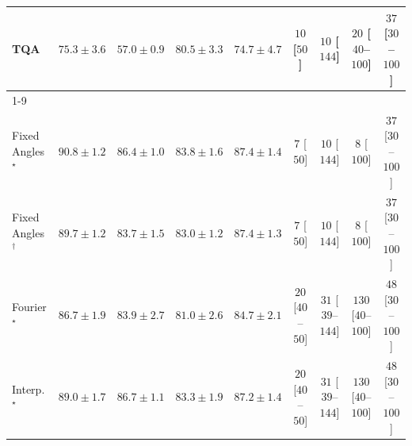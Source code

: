 \begin{tabular}{l|cccc|cccc|}
TQA & {\cellcolor[HTML]{F5841E}} \color[HTML]{F1F1F1} $75.3\pm 3.6$ & {\cellcolor[HTML]{FFFACD}} \color[HTML]{000000} $57.0\pm 0.9$ & {\cellcolor[HTML]{D75908}} \color[HTML]{F1F1F1} $80.5\pm 3.3$ & {\cellcolor[HTML]{F78921}} \color[HTML]{F1F1F1} $74.7\pm 4.7$ & {\cellcolor[HTML]{FFF7F3}} \color[HTML]{000000} $10$ [$50$] & {\cellcolor[HTML]{FFF7F3}} \color[HTML]{000000} $10$ [$144$] & {\cellcolor[HTML]{FFF4F0}} \color[HTML]{000000} $20$ [$40$--$100$] & {\cellcolor[HTML]{FEF1ED}} \color[HTML]{000000} $37$ [$30$--$100$] \\
\cline{1-9}
\multicolumn{9}{c}{\rule{0pt}{8pt}PP} \\
\midrule
Fixed Angles$^\star$ & {\cellcolor[HTML]{004A2B}} \color[HTML]{F1F1F1} $90.8\pm 1.2$ & {\cellcolor[HTML]{036B38}} \color[HTML]{F1F1F1} $86.4\pm 1.0$ & {\cellcolor[HTML]{177B3F}} \color[HTML]{F1F1F1} $83.8\pm 1.6$ & {\cellcolor[HTML]{006435}} \color[HTML]{F1F1F1} $87.4\pm 1.4$ & {\cellcolor[HTML]{FFF7F3}} \color[HTML]{000000} $7$ [$50$] & {\cellcolor[HTML]{FFF7F3}} \color[HTML]{000000} $10$ [$144$] & {\cellcolor[HTML]{FFF7F3}} \color[HTML]{000000} $8$ [$100$] & {\cellcolor[HTML]{FEF1ED}} \color[HTML]{000000} $37$ [$30$--$100$] \\
Fixed Angles$^\dagger$ & {\cellcolor[HTML]{00522E}} \color[HTML]{F1F1F1} $89.7\pm 1.2$ & {\cellcolor[HTML]{177B3F}} \color[HTML]{F1F1F1} $83.7\pm 1.5$ & {\cellcolor[HTML]{1D7F41}} \color[HTML]{F1F1F1} $83.0\pm 1.2$ & {\cellcolor[HTML]{006435}} \color[HTML]{F1F1F1} $87.4\pm 1.3$ & {\cellcolor[HTML]{FFF7F3}} \color[HTML]{000000} $7$ [$50$] & {\cellcolor[HTML]{FFF7F3}} \color[HTML]{000000} $10$ [$144$] & {\cellcolor[HTML]{FFF7F3}} \color[HTML]{000000} $8$ [$100$] & {\cellcolor[HTML]{FEF1ED}} \color[HTML]{000000} $37$ [$30$--$100$] \\
Fourier$^\star$ & {\cellcolor[HTML]{016937}} \color[HTML]{F1F1F1} $86.7\pm 1.9$ & {\cellcolor[HTML]{167A3F}} \color[HTML]{F1F1F1} $83.9\pm 2.7$ & {\cellcolor[HTML]{2B8E4A}} \color[HTML]{F1F1F1} $81.0\pm 2.6$ & {\cellcolor[HTML]{11753D}} \color[HTML]{F1F1F1} $84.7\pm 2.1$ & {\cellcolor[HTML]{FFF4F0}} \color[HTML]{000000} $20$ [$40$--$50$] & {\cellcolor[HTML]{FFF2EE}} \color[HTML]{000000} $31$ [$39$--$144$] & {\cellcolor[HTML]{FDDBD7}} \color[HTML]{000000} $130$ [$40$--$100$] & {\cellcolor[HTML]{FEEEEB}} \color[HTML]{000000} $48$ [$30$--$100$] \\
Interp.$^\star$ & {\cellcolor[HTML]{005830}} \color[HTML]{F1F1F1} $89.0\pm 1.7$ & {\cellcolor[HTML]{016937}} \color[HTML]{F1F1F1} $86.7\pm 1.1$ & {\cellcolor[HTML]{1A7D40}} \color[HTML]{F1F1F1} $83.3\pm 1.9$ & {\cellcolor[HTML]{006636}} \color[HTML]{F1F1F1} $87.2\pm 1.4$ & {\cellcolor[HTML]{FFF4F0}} \color[HTML]{000000} $20$ [$40$--$50$] & {\cellcolor[HTML]{FFF2EE}} \color[HTML]{000000} $31$ [$39$--$144$] & {\cellcolor[HTML]{FDDBD7}} \color[HTML]{000000} $130$ [$40$--$100$] & {\cellcolor[HTML]{FEEEEB}} \color[HTML]{000000} $48$ [$30$--$100$] \\

\end{tabular}

